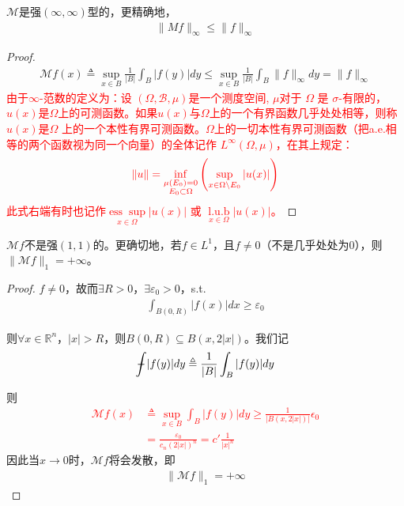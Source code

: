 \begin{proposition}[一个平凡的性质]
    $\mathcal{M}$是强$(\infty,\infty)$型的，更精确地，
    \begin{align*}
        \|Mf\|_{\infty} \leqslant \|f\|_{\infty}
    \end{align*}
\end{proposition}
\begin{proof}
    \begin{align*}
        \mathcal{M}f(x) \triangleq \sup\limits_{x\in B} \frac{1}{|B|} \int_{B} |f(y)| dy \leqslant  \sup\limits_{x\in B} \frac{1}{|B|} \int_{B} \|f\|_{\infty} dy = \|f\|_{\infty}
    \end{align*}
    \textcolor{red}{由于$\infty$-范数的定义为：设 $(\Omega, \mathscr{B}, \mu)$是一个测度空间, $\mu$对于 $\Omega$ 是 $\sigma$-有限的，$u(x)$是$\Omega$上的可测函数。如果$u(x)$与$\Omega$上的一个有界函数几乎处处相等，则称$u(x)$是$\Omega$ 上的一个本性有界可测函数。$\Omega$上的一切本性有界可测函数（把a.e.相等的两个函数视为同一个向量）的全体记作 $L^{\infty}(\Omega, \mu)$，在其上规定：}
    \begin{align*}
        \color{red} \|u\|=\inf _{\substack{\mu\left(E_0\right)=0 \\ E_0 \subset \Omega}}\left(\sup _{x \in \Omega \backslash E_0}|u(x)|\right)
    \end{align*}
    \textcolor{red}{此式右端有时也记作$\underset{x\in\Omega}{\operatorname{ess} \sup}|u(x)|$ 或 $\underset{x\in\Omega}{\operatorname{l.u.b}}|u(x)|$。}
\end{proof}

\begin{proposition}
    $\mathcal{M}f$不是强$(1,1)$的。更确切地，若$f\in L^1$，且$f\neq 0$（不是几乎处处为0），则$\|\mathcal{M}f\|_1 = +\infty$。
\end{proposition}
\begin{proof}
    $f\neq 0$，故而$\exists R>0$，$\exists \varepsilon_0>0$，s.t.
    \begin{align*}
        \int_{B(0,R)} |f(x)| dx \geqslant \varepsilon_0
    \end{align*}

    则$\forall x\in \mathbb{R}^n$，$|x|>R$，则$B(0,R)\subseteq B(x,2|x|)$。我们记
    \begin{align*}
        \bbint |f(y)| dy \triangleq \frac{1}{|B|} \int_B |f(y)| dy
    \end{align*}

    则
    \textcolor{red}{\begin{align*} 
        \mathcal{M}f(x) &\triangleq \sup\limits_{x\in B} \int_B |f(y)| dy \geqslant \frac{1}{|B(x,2|x|)|} \epsilon_0 \\
        & = \frac{\varepsilon_0}{c_n(2|x|)^n} = c' \frac{1}{|x|^n}
    \end{align*}}
    因此当$x\to 0$时，$\mathcal{M}f$将会发散，即
    \begin{align*}
        \|\mathcal{M}f\|_{1} = +\infty
    \end{align*}
\end{proof}

